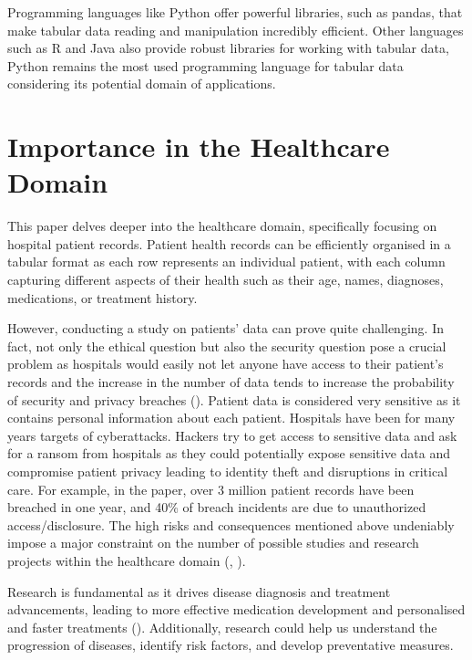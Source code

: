 \vspace{0.5cm}
Programming languages like Python offer powerful libraries, such as pandas, that make tabular data reading and manipulation incredibly efficient. Other languages such as R and Java also provide robust libraries for working with tabular data, Python remains the most used programming language for tabular data considering its potential domain of applications.

\section{Importance in the Healthcare Domain}
\label{sec:healthcare}

This paper delves deeper into the healthcare domain, specifically focusing on hospital patient records. Patient health records can be efficiently organised in a tabular format as each row represents an individual patient, with each column capturing different aspects of their health such as their age, names, diagnoses, medications, or treatment history. 

\vspace{0.5cm}
However, conducting a study on patients' data can prove quite challenging. In fact, not only the ethical question but also the security question pose a crucial problem as hospitals would easily not let anyone have access to their patient's records and the increase in the number of data tends to increase the probability of security and privacy breaches (\cite{Abouelmehdi2018}). Patient data is considered very sensitive as it contains personal information about each patient. Hospitals have been for many years targets of cyberattacks. Hackers try to get access to sensitive data and ask for a ransom from hospitals as they could potentially expose sensitive data and compromise patient privacy leading to identity theft and disruptions in critical care. For example, in the \cite{Abouelmehdi2018} paper, over 3 million patient records have been breached in one year, and 40\% of breach incidents are due to unauthorized access/disclosure. The high risks and consequences mentioned above undeniably impose a major constraint on the number of possible studies and research projects within the healthcare domain (\cite{DataSynthesizer2017}, \cite{ElEmam2020}). 

\vspace{0.5cm}
Research is fundamental as it drives disease diagnosis and treatment advancements, leading to more effective medication development and personalised and faster treatments (\cite{Abouelmehdi2018}). Additionally, research could help us understand the progression of diseases, identify risk factors, and develop preventative measures.

